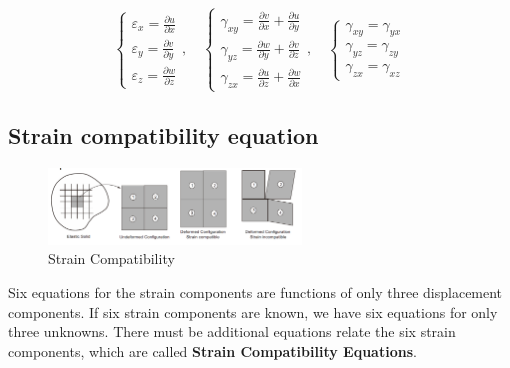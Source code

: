\documentclass[en,hazy,cyan,8pt,normal]{elegantnote}
\numberwithin{equation}{section}
\begin{document}
    \begin{equation}\label{eq:042}
      \left\{
      \begin{aligned}
        \displaystyle \varepsilon_x=\frac{\partial u}{\partial x}\\
        \displaystyle \varepsilon_y=\frac{\partial v}{\partial y}\\
        \displaystyle \varepsilon_z=\frac{\partial w}{\partial z}
      \end{aligned}
      \right.
      , \quad
      \left\{
      \begin{aligned}
        \displaystyle \gamma_{xy}=\frac{\partial v}{\partial x} + \frac{\partial u}{\partial y}\\
        \displaystyle \gamma_{yz}=\frac{\partial w}{\partial y} + \frac{\partial v}{\partial z}\\
        \displaystyle \gamma_{zx}=\frac{\partial u}{\partial z} + \frac{\partial w}{\partial x}
      \end{aligned}
      \right.
      , \quad
      \left\{
      \begin{aligned}
        \displaystyle \gamma_{xy}=\gamma_{yx}\\
        \displaystyle \gamma_{yz}=\gamma_{zy}\\
        \displaystyle \gamma_{zx}=\gamma_{xz}
      \end{aligned}
      \right.
    \end{equation}

  \subsection{Strain compatibility equation}
    \begin{figure}[H]
      \centering
      \includegraphics[width=0.6\textwidth]{image/012.png}
      \caption{Strain Compatibility}
      \label{fig:012}
    \end{figure}

    Six equations for the strain components are functions of only three displacement components. If six strain components are known, we have six equations for only three unknowns. There must be additional equations relate the six strain components, which are called \textbf{Strain Compatibility Equations}.\\
\end{document}
